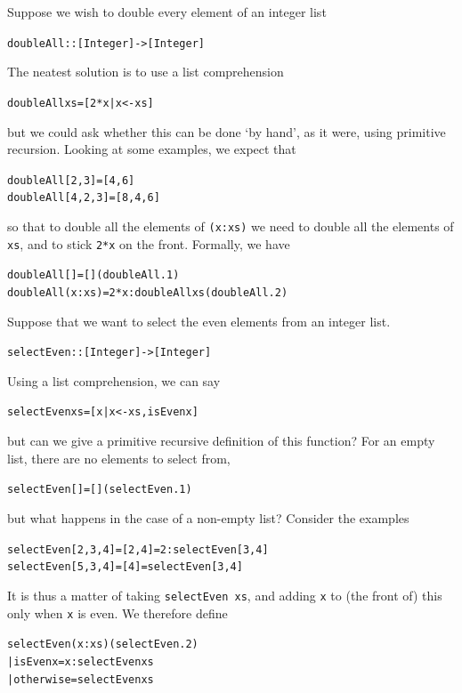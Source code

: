 \begin{example}
Suppose we wish to double every element of an integer list
\begin{alltt}
doubleAll :: [Integer] -> [Integer]
\end{alltt}
The neatest solution is to use a list comprehension
\begin{alltt}
doubleAll xs = [ 2*x | x<-xs ]
\end{alltt}
but we could ask whether this can be done `by hand', as it were, using
primitive recursion. Looking at some examples, we expect that
\begin{alltt}
  doubleAll [2,3] =   [4,6]               
doubleAll [4,2,3] = [8,4,6]
\end{alltt}
so that to double all the elements of \texttt{(x:xs)} we need to double
all the elements of \texttt{xs}, and to stick \texttt{2*x} on the front.
Formally, we have
\begin{alltt}
doubleAll []     = []\hfill(doubleAll.1)
doubleAll (x:xs) = 2*x : doubleAll xs\hfill(doubleAll.2)
\end{alltt}

Suppose that we want to select the even elements from an integer list. 
\begin{alltt}
selectEven :: [Integer] -> [Integer]
\end{alltt}
Using a list comprehension, we can say
\begin{alltt}
selectEven xs = [ x | x<-xs , isEven x ]
\end{alltt}
but can we give a primitive recursive definition of this function?
For an empty list, there are no elements to select from,
\begin{alltt}
selectEven [] = []\hfill(selectEven.1)
\end{alltt}
but what happens in the case of a non-empty list? Consider the examples
\begin{alltt}
selectEven [2,3,4] = [2,4] = 2 : selectEven [3,4]
selectEven [5,3,4] =   [4] =     selectEven [3,4]
\end{alltt}
It is thus a matter of taking \texttt{selectEven xs}, and adding \texttt{x}
to (the front of) this only when \texttt{x} is even. We therefore define
\begin{alltt}
selectEven (x:xs)\hfill(selectEven.2)
  | isEven x    = x : selectEven xs
  | otherwise   =     selectEven xs
\end{alltt}


\end{example}
